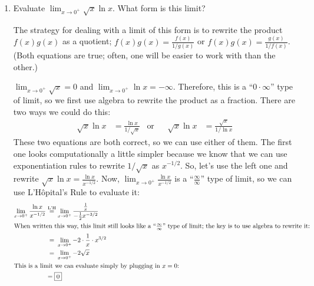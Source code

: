 \documentclass[main]{subfiles}
\begin{document}
\begin{enumerate}
\begin{enumerate}[start=5]
  \end{enumerate}


  \item  

  
  \begin{problem}[\nstretch{2}]
    Evaluate $\displaystyle \lim_{x \to 0^+} \sqrt{x} \ln x$.  What form
    is this limit?

    The strategy for dealing with a limit of this form is to rewrite the
    product $f(x) g(x)$ as a quotient; $f(x) g(x) = \frac{f(x)}{1 / g(x)}$
    or $f(x) g(x) = \frac{g(x)}{1 / f(x)}$.  (Both equations are true;
    often, one will be easier to work with than the other.)
  \end{problem}

  \begin{solution}
    $\displaystyle \lim_{x \to 0^+} \sqrt{x} = 0$ and $\displaystyle
    \lim_{x \to 0^+} \ln x = -\infty$.  Therefore, this is a ``$0 \cdot
    \infty$'' type of limit, so we first use algebra to rewrite the
    product as a fraction.  There are two ways we could do this:
    \begin{align*}
      \sqrt{x} \ln x &= \frac{\ln x}{1 / \sqrt{x}} & \text{or} &&
      \sqrt{x} \ln x &= \frac{\sqrt{x}}{1 / \ln x}
    \end{align*}
    These two equations are both correct, so we can use either of them.
    The first one looks computationally a little simpler because we know
    that we can use exponentiation rules to rewrite $1 / \sqrt{x}$ as
    $x^{-1/2}$.  So, let's use the left one and rewrite $\displaystyle
    \sqrt{x} \ln x = \frac{\ln x}{x^{-1/2}}$.  Now, $\displaystyle
    \lim_{x \to 0^+} \frac{\ln x}{x^{-1/2}}$ is a
    ``$\frac{\infty}{\infty}$'' type of limit, so we can use
    L'Hôpital's Rule to evaluate it:
    \begin{align*}
      \lim_{x \to 0^+} \frac{\ln x}{x^{-1/2}} &
      \lheq \lim_{x \to 0^+}
      \frac{\frac{1}{x}}{ - \frac{1}{2} x^{-3/2}} \\
      \intertext{When written this way, this limit still looks like a
        ``$\frac{\infty}{\infty}$'' type of limit; the key is to use
        algebra to rewrite it:} %
      & \nolheq \lim_{x \to 0^+} -2 \cdot \frac{1}{x} \cdot x^{3/2} \\
      & \nolheq \lim_{x \to 0^+} -2 \sqrt{x} \\
      \intertext{This is a limit we can evaluate simply by plugging in
        $x = 0$:}  %
      &= \boxed{0}
    \end{align*}      
  \end{solution}


\end{enumerate}
\end{document}
